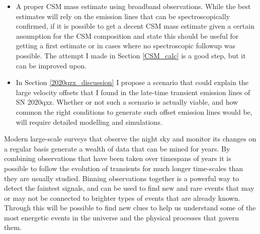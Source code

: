 \documentclass[a4paper,oneside,12pt, class=Latex/Classes/PhDthesisPSnPDF, crop=false]{standalone}
\begin{document}
\begin{itemize}
	\item A proper CSM mass estimate using broadband observations. While the best estimates will rely on the emission lines that can be spectroscopically confirmed, if it is possible to get a decent CSM mass estimate given a certain assumption for the CSM composition and state this should be useful for getting a first estimate or in cases where no spectroscopic followup was possible. The attempt I made in Section \ref{CSM_calc} is a good step, but it can be improved upon.
	\item In Section \ref{2020qzx_discussion} I propose a scenario that could explain the large velocity offsets that I found in the late-time transient emission lines of SN 2020qxz. Whether or not such a scenario is actually viable, and how common the right conditions to generate such offset emission lines would be, will require detailed modelling and simulations.
\end{itemize}

Modern large-scale surveys that observe the night sky and monitor its changes on a regular basis generate a wealth of data that can be mined for years. By combining observations that have been taken over timespans of years it is possible to follow the evolution of transients for much longer time-scales than they are usually studied. Binning observations together is a powerful way to detect the faintest signals, and can be used to find new and rare events that may or may not be connected to brighter types of events that are already known. Through this will be possible to find new clues to help us understand some of the most energetic events in the universe and the physical processes that govern them.
\end{document}

